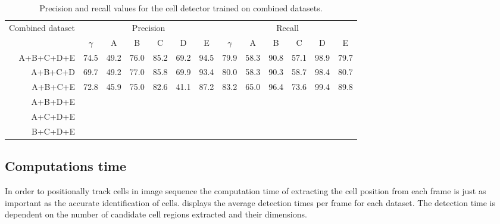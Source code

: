 		\begin{table}[h]
			\centering
			\begin{tabular}{r|*{6}{c}|*{6}{c}}
				\multicolumn{1}{c}{Combined dataset} & \multicolumn{6}{|c|}{Precision}             &         \multicolumn{6}{c}{Recall}          \\
				                                     & $\gamma$ &  A   &  B   &  C   &  D   &  E   & $\gamma$ &  A   &  B   &  C   &  D   &  E   \\
			\hline
				                           A+B+C+D+E &   74.5   & 49.2 & 76.0 & 85.2 & 69.2 & 94.5 &   79.9   & 58.3 & 90.8 & 57.1 & 98.9 & 79.7 \\
				                             A+B+C+D &   69.7   & 49.2 & 77.0 & 85.8 & 69.9 & 93.4 &   80.0   & 58.3 & 90.3 & 58.7 & 98.4 & 80.7 \\
				                             A+B+C+E &   72.8   & 45.9 & 75.0 & 82.6 & 41.1 & 87.2 &   83.2   & 65.0 & 96.4 & 73.6 & 99.4 & 89.8 \\
				                             A+B+D+E &          &      &      &      &      &      &          &      &      &      &      &  \\
				                             A+C+D+E &          &      &      &      &      &      &          &      &      &      &      &  \\
				                             B+C+D+E &          &      &      &      &      &      &          &      &      &      &      &
			\end{tabular} 
			\caption{Precision and recall values for the cell detector trained on combined datasets.}
			\label{tab:results_detector_combined}
		\end{table}
				

	\subsection{Computations time \statusnew}
	
		In order to positionally track cells in image sequence the computation time of extracting the cell position from each frame is just as important as the accurate identification of cells.  displays the average detection times per frame for each dataset. The detection time is dependent on the number of candidate cell regions extracted and their dimensions.
		
